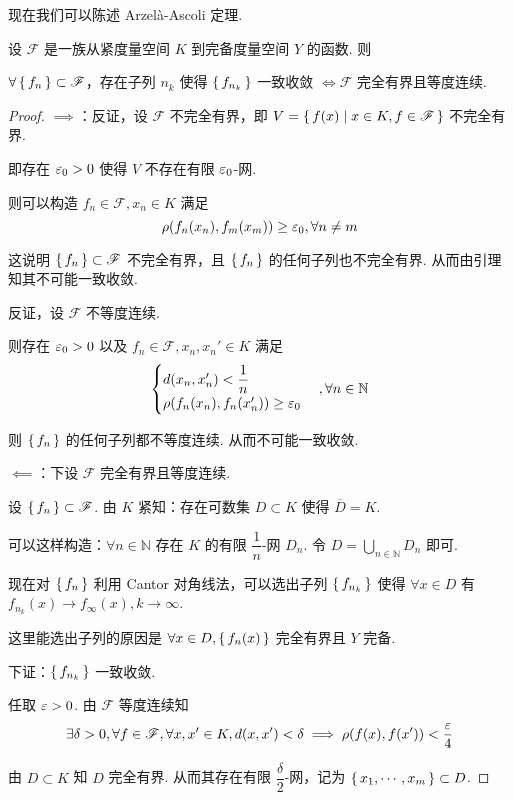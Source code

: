 现在我们可以陈述 Arzelà-Ascoli 定理.

\begin{theorem}
    设 $\mathscr{F}$ 是一族从紧度量空间 $K$ 到完备度量空间 $Y$ 的函数. 则

    $\forall\set{f_n}\subset\mathscr{F}$，存在子列 $n_k$ 使得 $\set{f_{n_k}}$ 一致收敛 $\iff\mathscr{F}$ 完全有界且等度连续.
\end{theorem}
\begin{proof}
    $\implies$：反证，设 $\mathscr{F}$ 不完全有界，即 $V=\set{f(x)|x\in K,f\in\mathscr{F}}$ 不完全有界.
    
    即存在 $\varepsilon_0>0$ 使得 $V$ 不存在有限 $\varepsilon_0$-网.

    则可以构造 $f_n\in\mathscr{F},x_n\in K$ 满足
$$
\rho(f_n(x_n),f_m(x_m))\ge\varepsilon_0,\forall n\ne m
$$

    这说明 $\set{f_n}\subset\mathscr{F}$ 不完全有界，且 $\set{f_n}$ 的任何子列也不完全有界. 从而由引理知其不可能一致收敛.

    反证，设 $\mathscr{F}$ 不等度连续.

    则存在 $\varepsilon_0>0$ 以及 $f_n\in\mathscr{F},x_n,x_n'\in K$ 满足
$$
\begin{cases}
    d(x_n,x_n')<\dfrac{1}{n}\\
    \rho(f_n(x_n),f_n(x_n'))\ge\varepsilon_0
\end{cases},\forall n\in\mathbb{N}
$$

    则 $\set{f_n}$ 的任何子列都不等度连续. 从而不可能一致收敛.

    $\impliedby$：下设 $\mathscr{F}$ 完全有界且等度连续.

    设 $\set{f_n}\subset\mathscr{F}$. 由 $K$ 紧知：存在可数集 $D\subset K$ 使得 $\overline{D}=K$.

    可以这样构造：$\forall n\in\mathbb{N}$ 存在 $K$ 的有限 $\dfrac{1}{n}$-网 $D_n$. 令 $D=\bigcup\limits_{n\in\mathbb{N}}D_n$ 即可.

    现在对 $\set{f_n}$ 利用 Cantor 对角线法，可以选出子列 $\set{f_{n_k}}$ 使得 $\forall x\in D$ 有 $f_{n_k}(x)\to f_\infty(x),k\to\infty$.

    这里能选出子列的原因是 $\forall x\in D,\set{f_n(x)}$ 完全有界且 $Y$ 完备.

    下证：$\set{f_{n_k}}$ 一致收敛.

    任取 $\varepsilon>0$. 由 $\mathscr{F}$ 等度连续知
$$
\exists\delta>0,\forall f\in\mathscr{F},\forall x,x'\in K,d(x,x')<\delta\implies\rho(f(x),f(x'))<\frac{\varepsilon}{4}
$$

    由 $D\subset K$ 知 $D$ 完全有界. 从而其存在有限 $\dfrac{\delta}{2}$-网，记为 $\set{x_1,\cdots,x_m}\subset D$.


\end{proof}
